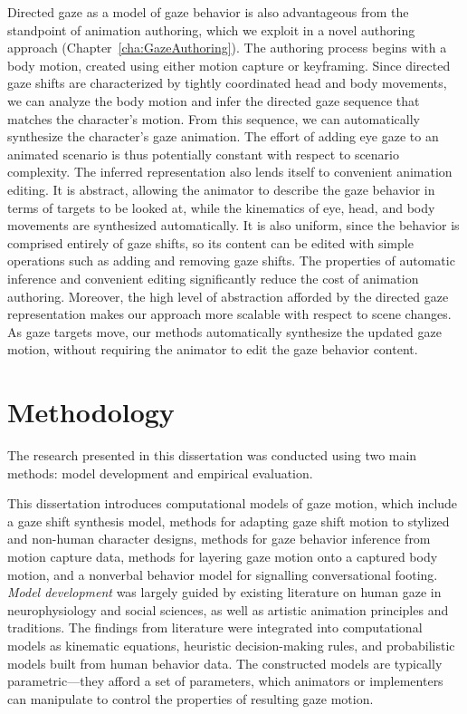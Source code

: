 Directed gaze as a model of gaze behavior is also advantageous from the standpoint of animation authoring, which we exploit in a novel authoring approach (Chapter~\ref{cha:GazeAuthoring}). The authoring process begins with a body motion, created using either motion capture or keyframing. Since directed gaze shifts are characterized by tightly coordinated head and body movements, we can analyze the body motion and infer the directed gaze sequence that matches the character's motion. From this sequence, we can automatically synthesize the character's gaze animation. The effort of adding eye gaze to an animated scenario is thus potentially constant with respect to scenario complexity. The inferred representation also lends itself to convenient animation editing. It is abstract, allowing the animator to describe the gaze behavior in terms of targets to be looked at, while the kinematics of eye, head, and body movements are synthesized automatically. It is also uniform, since the behavior is comprised entirely of gaze shifts, so its content can be edited with simple operations such as adding and removing gaze shifts. The properties of automatic inference and convenient editing significantly reduce the cost of animation authoring. Moreover, the high level of abstraction afforded by the directed gaze representation makes our approach more scalable with respect to scene changes. As gaze targets move, our methods automatically synthesize the updated gaze motion, without requiring the animator to edit the gaze behavior content.

\section{Methodology}

The research presented in this dissertation was conducted using two main methods: model development and empirical evaluation.

This dissertation introduces computational models of gaze motion, which include a gaze shift synthesis model, methods for adapting gaze shift motion to stylized and non-human character designs, methods for gaze behavior inference from motion capture data, methods for layering gaze motion onto a captured body motion, and a nonverbal behavior model for signalling conversational footing. \emph{Model development} was largely guided by existing literature on human gaze in neurophysiology and social sciences, as well as artistic animation principles and traditions. The findings from literature were integrated into computational models as kinematic equations, heuristic decision-making rules, and probabilistic models built from human behavior data. The constructed models are typically parametric---they afford a set of parameters, which animators or implementers can manipulate to control the properties of resulting gaze motion.

